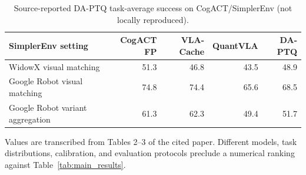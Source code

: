 \begin{table}[h!]
\centering
\caption{Source-reported DA-PTQ task-average success on CogACT/SimplerEnv (not locally reproduced).}
\label{tab:daptq_source}
\small
\setlength{\tabcolsep}{5.0pt}
\renewcommand{\arraystretch}{1.08}
\begin{tabular}{@{}lrrrr@{}}
\toprule
SimplerEnv setting & CogACT FP & VLA-Cache & QuantVLA & DA-PTQ \\
\midrule
WidowX visual matching & 51.3 & 46.8 & 43.5 & 48.9 \\
Google Robot visual matching & 74.8 & 74.4 & 65.6 & 68.5 \\
Google Robot variant aggregation & 61.3 & 62.3 & 49.4 & 51.7 \\
\bottomrule
\end{tabular}
\vspace{2pt}
\parbox{0.99\textwidth}{\footnotesize Values are transcribed from Tables 2--3 of the cited paper. Different models, task distributions, calibration, and evaluation protocols preclude a numerical ranking against Table~\ref{tab:main_results}.}
\end{table}
